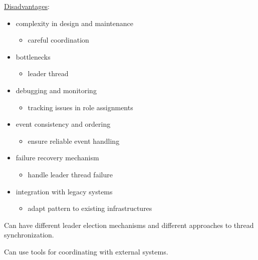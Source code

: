 \documentclass[11pt]{article}
\begin{document}
\uline{Disadvantages}:
\begin{itemize}
\item complexity in design and maintenance
\begin{itemize}
\item careful coordination
\end{itemize}
\item bottlenecks
\begin{itemize}
\item leader thread
\end{itemize}
\item debugging and monitoring
\begin{itemize}
\item tracking issues in role assignments
\end{itemize}
\item event consistency and ordering
\begin{itemize}
\item ensure reliable event handling
\end{itemize}
\item failure recovery mechanism
\begin{itemize}
\item handle leader thread failure
\end{itemize}
\item integration with legacy systems
\begin{itemize}
\item adapt pattern to existing infrastructures
\end{itemize}
\end{itemize}

Can have different leader election mechanisms and
different approaches to thread synchronization.

Can use tools for coordinating with external systems.
\end{document}
